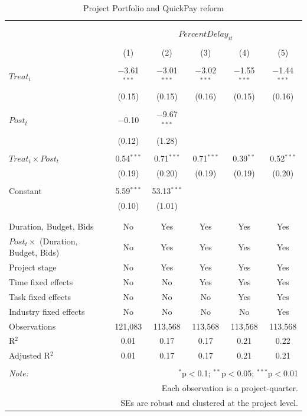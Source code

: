 \documentclass[
]{article}
\begin{document}
\begin{table}[H] \centering 
  \caption{Project Portfolio and QuickPay reform} 
  \label{} 
\small 
\begin{tabular}{@{\extracolsep{-2pt}}lccccc} 
\\[-1.8ex]\hline 
\hline \\[-1.8ex] 
\\[-1.8ex] & \multicolumn{5}{c}{$PercentDelay_{it}$} \\ 
\\[-1.8ex] & (1) & (2) & (3) & (4) & (5)\\ 
\hline \\[-1.8ex] 
 $Treat_i$ & $-$3.61$^{***}$ & $-$3.01$^{***}$ & $-$3.02$^{***}$ & $-$1.55$^{***}$ & $-$1.44$^{***}$ \\ 
  & (0.15) & (0.15) & (0.16) & (0.15) & (0.16) \\ 
  & & & & & \\ 
 $Post_t$ & $-$0.10 & $-$9.67$^{***}$ &  &  &  \\ 
  & (0.12) & (1.28) &  &  &  \\ 
  & & & & & \\ 
 $Treat_i \times Post_t$ & 0.54$^{***}$ & 0.71$^{***}$ & 0.71$^{***}$ & 0.39$^{**}$ & 0.52$^{***}$ \\ 
  & (0.19) & (0.20) & (0.19) & (0.19) & (0.20) \\ 
  & & & & & \\ 
 Constant & 5.59$^{***}$ & 53.13$^{***}$ &  &  &  \\ 
  & (0.10) & (1.01) &  &  &  \\ 
  & & & & & \\ 
\hline \\[-1.8ex] 
Duration, Budget, Bids & No & Yes & Yes & Yes & Yes \\ 
$Post_t \times $  (Duration, Budget, Bids) & No & Yes & Yes & Yes & Yes \\ 
Project stage & No & Yes & Yes & Yes & Yes \\ 
Time fixed effects & No & No & Yes & Yes & Yes \\ 
Task fixed effects & No & No & No & Yes & Yes \\ 
Industry fixed effects & No & No & No & No & Yes \\ 
Observations & 121,083 & 113,568 & 113,568 & 113,568 & 113,568 \\ 
R$^{2}$ & 0.01 & 0.17 & 0.17 & 0.21 & 0.22 \\ 
Adjusted R$^{2}$ & 0.01 & 0.17 & 0.17 & 0.21 & 0.21 \\ 
\hline 
\hline \\[-1.8ex] 
\textit{Note:}  & \multicolumn{5}{r}{$^{*}$p$<$0.1; $^{**}$p$<$0.05; $^{***}$p$<$0.01} \\ 
 & \multicolumn{5}{r}{Each observation is a project-quarter.} \\ 
 & \multicolumn{5}{r}{SEs are robust and clustered at the project level.} \\ 
\end{tabular} 
\end{table}
\end{document}
